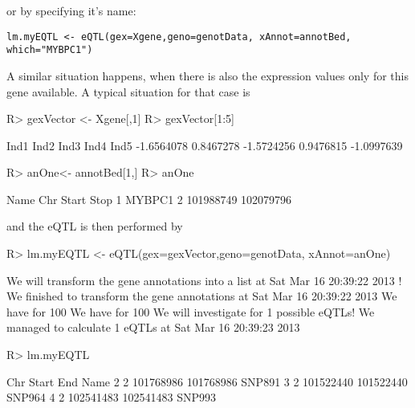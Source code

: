 \documentclass[a4paper,10pt]{article}
\begin{document}
or by specifying it's name:

\begin{verbatim}
lm.myEQTL <- eQTL(gex=Xgene,geno=genotData, xAnnot=annotBed, which="MYBPC1")
\end{verbatim}



A similar situation happens, when there is also the expression values only for this gene available. A typical situation for that case is

\begin{Schunk}
\begin{Sinput}
R> gexVector <- Xgene[,1]
R> gexVector[1:5]
\end{Sinput}
\begin{Soutput}
      Ind1       Ind2       Ind3       Ind4       Ind5 
-1.6564078  0.8467278 -1.5724256  0.9476815 -1.0997639 
\end{Soutput}
\begin{Sinput}
R> anOne<- annotBed[1,]
R> anOne
\end{Sinput}
\begin{Soutput}
    Name Chr     Start      Stop
1 MYBPC1   2 101988749 102079796
\end{Soutput}
\end{Schunk}

and the eQTL is then performed by

\begin{Schunk}
\begin{Sinput}
R> lm.myEQTL <- eQTL(gex=gexVector,geno=genotData, xAnnot=anOne)
\end{Sinput}
\begin{Soutput}
We will transform the gene annotations into a list at Sat Mar 16 20:39:22 2013 !
We finished to transform the gene annotations at Sat Mar 16 20:39:22 2013 
We have for 100 % of the samples in the expression data the genotype information. 
We have for 100 % of the expression data the annotations. 
We will investigate for 1 possible eQTLs! 
We managed to calculate 1 eQTLs at Sat Mar 16 20:39:23 2013 
\end{Soutput}
\begin{Sinput}
R> lm.myEQTL
\end{Sinput}
\begin{Soutput}
  Chr     Start       End   Name
2   2 101768986 101768986 SNP891
3   2 101522440 101522440 SNP964
4   2 102541483 102541483 SNP993
\end{Soutput}
\end{Schunk}
\end{document}
